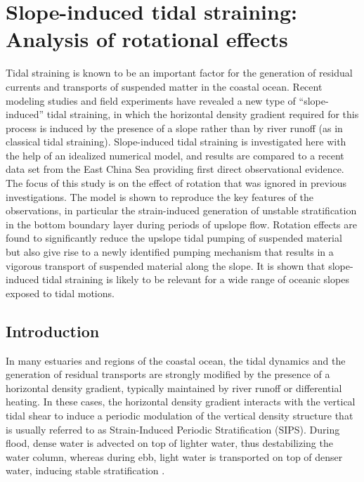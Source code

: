 \chapter{Slope-induced tidal straining: Analysis of rotational effects}
\label{kap-jgr}

Tidal straining is known to be an important factor for the generation
of residual currents and transports of suspended matter in the coastal
ocean. Recent modeling studies and field experiments have revealed a
new type of ``slope-induced'' tidal straining, in which the horizontal
density gradient required for this process is induced by the presence
of a slope rather than by river runoff (as in classical tidal
straining). Slope-induced tidal straining is investigated here with
the help of an idealized numerical model, and results are compared to
a recent data set from the East China Sea providing first direct
observational evidence. The focus of this study is on the effect of
rotation that was ignored in previous investigations. The model is
shown to reproduce the key features of the observations, in particular
the strain-induced generation of unstable stratification in the bottom
boundary layer during periods of upslope flow. Rotation effects are
found to significantly reduce the upslope tidal pumping of suspended
material but also give rise to a newly identified pumping mechanism
that results in a vigorous transport of suspended material along the
slope. It is shown that slope-induced tidal straining is likely to be
relevant for a wide range of oceanic slopes exposed to tidal motions.

\section{Introduction}
In many estuaries and regions of the coastal ocean, the tidal dynamics
and the generation of residual transports are strongly modified by the
presence of a horizontal density gradient, typically maintained by
river runoff or differential heating. In these cases, the horizontal
density gradient interacts with the vertical tidal shear to induce a
periodic modulation of the vertical density structure that is usually
referred to as Strain-Induced Periodic Stratification (SIPS). During
flood, dense water is advected on top of lighter water, thus
destabilizing the water column, whereas during ebb, light water is
transported on top of denser water, inducing stable stratification
\citep{vanAken86a,Simpsonetal90a}.


